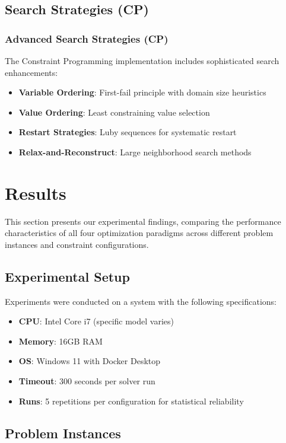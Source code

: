 \documentclass[11pt]{article}
\begin{document}
\subsection{Search Strategies (CP)}
\subsubsection{Advanced Search Strategies (CP)}

The Constraint Programming implementation includes sophisticated search enhancements:

\begin{itemize}
    \item \textbf{Variable Ordering}: First-fail principle with domain size heuristics
    \item \textbf{Value Ordering}: Least constraining value selection
    \item \textbf{Restart Strategies}: Luby sequences for systematic restart
    \item \textbf{Relax-and-Reconstruct}: Large neighborhood search methods
\end{itemize}

\section{Results}

This section presents our experimental findings, comparing the performance characteristics of all four optimization paradigms across different problem instances and constraint configurations.

\subsection{Experimental Setup}

Experiments were conducted on a system with the following specifications:
\begin{itemize}
    \item \textbf{CPU}: Intel Core i7 (specific model varies)
    \item \textbf{Memory}: 16GB RAM
    \item \textbf{OS}: Windows 11 with Docker Desktop
    \item \textbf{Timeout}: 300 seconds per solver run
    \item \textbf{Runs}: 5 repetitions per configuration for statistical reliability
\end{itemize}

\subsection{Problem Instances}
\end{document}
